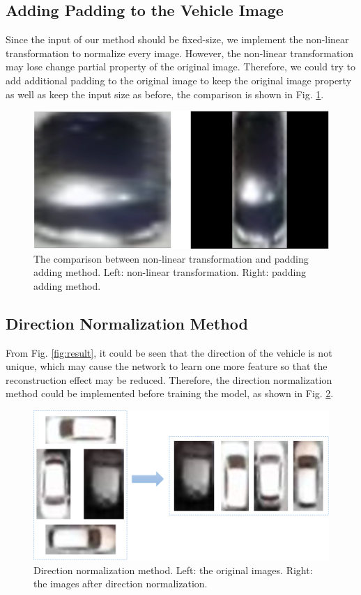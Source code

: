 \subsection{Adding Padding to the Vehicle Image}

Since the input of our method should be fixed-size, we implement the non-linear transformation to normalize every image. However, the non-linear transformation may lose change partial property of the original image. Therefore, we could try to add additional padding to the original image to keep the original image property as well as keep the input size as before, the comparison is shown in Fig. \ref{fig:padding}.
\begin{figure}[!ht]
	\centering
	\includegraphics[width=0.7\linewidth]{contents/padding and stretching.png}
	\caption{The comparison between non-linear transformation and padding adding method. Left: non-linear transformation. Right: padding adding method.}
    \label{fig:padding}
\end{figure}
\subsection{Direction Normalization Method}

From Fig. \ref{fig:result}, it could be seen that the direction of the vehicle is not unique, which may cause the network to learn one more feature so that the reconstruction effect may be reduced. Therefore, the direction normalization method could be implemented before training the model, as shown in Fig. \ref{fig:DNM}.
    
\begin{figure}[!ht]
	\centering
	\includegraphics[width=0.9\linewidth]{contents/direction normalization method.png}
	\caption{Direction normalization method. Left: the original images. Right: the images after direction normalization.}
    \label{fig:DNM}
\end{figure}


